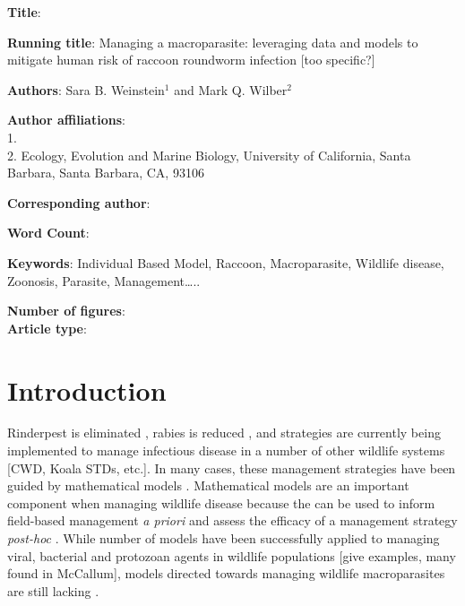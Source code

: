 \documentclass[11pt]{article}
\begin{document}
\noindent
\textbf{Title}: 

\bigskip

\noindent
\textbf{Running title}: Managing a macroparasite: leveraging data and models to mitigate human risk of raccoon roundworm infection [too specific?]

\bigskip

\noindent
\textbf{Authors}: Sara B. Weinstein$^1$ and Mark Q. Wilber$^2$

\bigskip

\noindent
\textbf{Author affiliations}: \\
1. \\
2. Ecology, Evolution and Marine Biology, University of California, Santa Barbara, Santa Barbara, CA, 93106 \\

\bigskip

\noindent
\textbf{Corresponding author}:

\bigskip

\noindent
\textbf{Word Count}: 

\bigskip

\noindent
\textbf{Keywords}: Individual Based Model, Raccoon, Macroparasite,
Wildlife disease, Zoonosis, Parasite, Management\ldots{}..

\bigskip

\noindent
\textbf{Number of figures}:  \\
\textbf{Article type}: 

\clearpage

\section{Introduction}

Rinderpest is eliminated \citep{Roeder2011}, rabies is reduced \citep{Freuling2013}, and strategies are currently being implemented to manage infectious disease in a number of other wildlife systems [CWD, Koala STDs, etc.]. In many cases, these management strategies have been
guided by mathematical models \citep[e.g.][]{Restif2012,McCallum2017}.  Mathematical models are an important component when managing wildlife disease because the can be used to inform field-based management \emph{a priori} and assess the efficacy of a management strategy \emph{post-hoc} \citep{Restif2012}.  While number of models have been successfully applied to managing
viral, bacterial and protozoan agents in wildlife populations [give examples, many found in McCallum], models directed
towards managing wildlife macroparasites are still lacking \citep[][, but note significant work has been done in managing macroparasites in livestock populations (citaitons)]{McCallum2017}.
\end{document}
